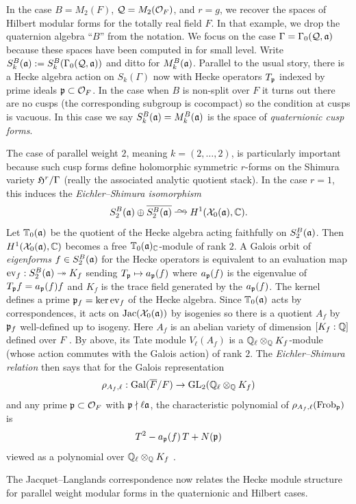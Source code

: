 \documentclass[main.tex]{subfiles}
\begin{document}
In the case $B = M_2(F)$, $\cQ = M_2(\cO_F)$, and  $r = g$, we recover the spaces of Hilbert modular forms for the totally real field $F$. In that example, we drop the quaternion algebra ``$B$'' from the notation. We focus on the case $\Gamma = \Gamma_0(\cQ, \aa)$ because these spaces have been computed in \cite{lmfdb} for small level. Write $S_k^B(\aa) := S_k^B(\Gamma_0(\cQ, \aa))$ and ditto for $M_k^B(\aa)$. Parallel to the usual story, there is a Hecke algebra action on $S_k(\Gamma)$ now with Hecke operators $T_{\p}$ indexed by prime ideals $\p \subset \cO_F$. In the case when $B$ is non-split over $F$ it turns out there are no cusps (the corresponding subgroup is cocompact) so the condition at cusps is vacuous. In this case we say $S_k^B(\aa) = M_k^B(\aa)$ is the space of \textit{quaternionic cusp forms}.
\par
The case of parallel weight $2$, meaning $k = (2,\dots,2)$, is particularly important because such cusp forms define holomorphic symmetric $r$-forms on the Shimura variety $\frH^r / \Gamma$ (really the associated analytic quotient stack). In the case $r = 1$, this induces the \textit{Eichler--Shimura isomorphism}
\[ S_2^B(\aa) \oplus \ol{S_2^B(\aa)} \iso H^1(\X_0(\aa), \CC). \]
Let $\TT_0(\aa)$ be the quotient of the Hecke algebra acting faithfully on $S_2^B(\aa)$. Then $H^1(\X_0(\aa), \CC)$ becomes a free $\TT_0(\aa)_{\CC}$-module of rank $2$. A Galois orbit of \textit{eigenforms} $f \in S_2^B(\aa)$ for the Hecke operators is equivalent to an evaluation map $\ev_f : S_2^B(\aa) \onto K_f$ sending $T_{\p} \mapsto a_{\p}(f)$ where $a_{\p}(f)$ is the eigenvalue of $T_{\p} f = a_{\p}(f) f$ and $K_f$ is the trace field generated by the $a_{\p}(f)$. The kernel defines a prime $\p_f = \ker{\ev_f}$ of the Hecke algebra. Since $\TT_0(\aa)$ acts by correspondences, it acts on $\Jac(\X_0(\aa))$ by isogenies so there is a quotient $A_f$ by $\p_f$ well-defined up to isogeny. Here $A_f$ is an abelian variety of dimension $[K_f : \Q]$ defined over $F$ \cite{zhang:heegner_points}. By above, its Tate module $V_{\ell}(A_f)$ is a $\Q_{\ell} \ot_{\Q} K_f$-module (whose action commutes with the Galois action) of rank $2$. The \textit{Eichler--Shimura relation} then says that for the Galois representation
\[ \rho_{A_f, \ell} : \Gal(\ol{F}/F) \to \GL_2(\Q_{\ell} \ot_{\Q} K_f) \]
and any prime $\p \subset \cO_F$ with $\p \nmid \ell \aa$, the characteristic polynomial of $\rho_{A_f, \ell}(\Frob_{\p})$ is
\[ T^2 - a_{\p}(f) \, T + N(\p) \]
viewed as a polynomial over $\Q_{\ell} \ot_{\Q} K_f$ \cite[\S10.3]{carayol:representations}.
\par
The Jacquet--Langlands correspondence now relates the Hecke module structure for parallel weight modular forms in the quaternionic and Hilbert cases.
\end{document}
